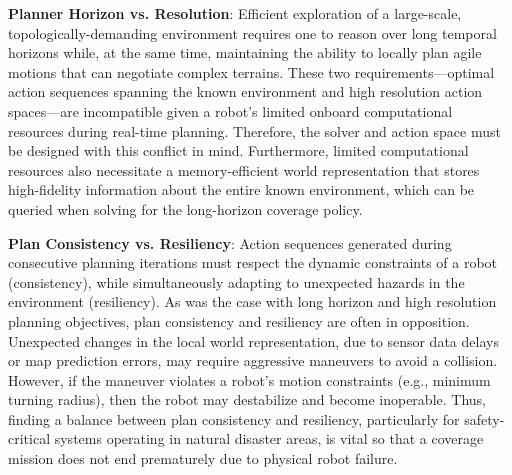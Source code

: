 \documentclass[letterpaper]{article} %
\newcommand{\ph}[1]{{\textbf{#1}:}} %
\begin{document}
\ph{Planner Horizon vs. Resolution}
 Efficient exploration of a large-scale, topologically-demanding environment requires one to reason over long temporal horizons while, at the same time, maintaining the ability to locally plan agile motions that can negotiate complex terrains. These two requirements---optimal action sequences spanning the known environment and high resolution action spaces---are incompatible given a robot's limited onboard computational resources during real-time planning. Therefore, the solver and action space must be designed with this conflict in mind. Furthermore, limited computational resources also necessitate a memory-efficient world representation that stores high-fidelity information about the entire known environment, which can be queried when solving for the long-horizon coverage policy. 
 
\ph{Plan Consistency vs. Resiliency}
Action sequences generated during consecutive planning iterations must respect the dynamic constraints of a robot (consistency), while simultaneously adapting to unexpected hazards in the environment (resiliency). As was the case with long horizon and high resolution planning objectives, plan consistency and resiliency are often in opposition. Unexpected changes in the local world representation, due to sensor data delays or map prediction errors, may require aggressive maneuvers to avoid a collision. However, if the maneuver violates a robot's motion constraints (e.g., minimum turning radius), then the robot may destabilize and become inoperable. Thus, finding a balance between plan consistency and resiliency, particularly for safety-critical systems operating in natural disaster areas, is vital so that a coverage mission does not end prematurely due to physical robot failure. 





\end{document}
